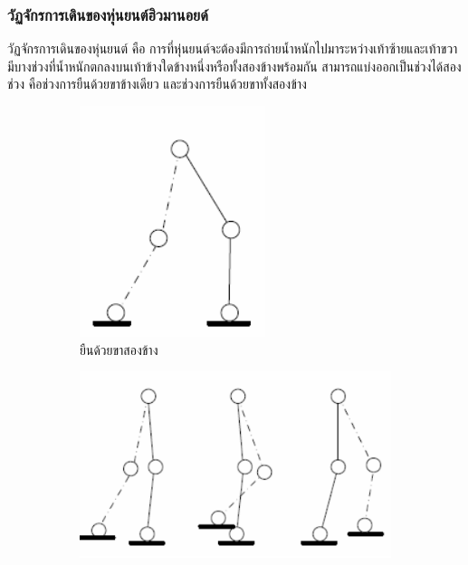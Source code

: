 \subsubsection{วัฏจักรการเดินของหุ่นยนต์ฮิวมานอยด์}
วัฏจักรการเดินของหุ่นยนต์ คือ การที่หุ่นยนต์จะต้องมีการถ่ายน้ำหนักไปมาระหว่างเท้าซ้ายและเท้าขวา
มีบางช่วงที่น้ำหนักตกลงบนเท้าข้างใดข้างหนึ่งหรือทั้งสองข้างพร้อมกัน สามารถแบ่งออกเป็นช่วงได้สองช่วง คือช่วงการยืนด้วยขาข้างเดียว
และช่วงการยืนด้วยขาทั้งสองข้าง
\begin{figure}[ht]
	\centering
	\begin{subfigure}[b]{0.22\textwidth}
		\centering
		\includegraphics[width=\textwidth]{chapter2/images/doublesupport.png}
		\caption{ยืนด้วยขาสองข้าง}
		\label{fig:robot_walk_1}
	\end{subfigure}
	\hfill
	\begin{subfigure}[b]{0.45\textwidth}
		\centering
		\includegraphics[width=\textwidth]{chapter2/images/singlesupport.png}

\end{subfigure}
\end{figure}
